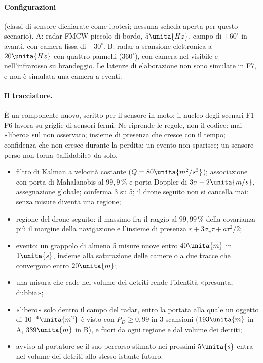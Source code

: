 \paragraph{Configurazioni} (classi di sensore dichiarate come ipotesi; nessuna scheda aperta per questo scenario). A: radar FMCW piccolo di bordo, $5\unita{Hz}$, campo di $\pm60^\circ$ in avanti, con camera fissa di $\pm30^\circ$. B: radar a scansione elettronica a $20\unita{Hz}$ con quattro pannelli ($360^\circ$), con camera nel visibile e nell'infrarosso su brandeggio. Le latenze di elaborazione non sono simulate in F7, e non è simulata una camera a eventi.

\paragraph{Il tracciatore.} È un componente nuovo, scritto per il sensore in moto: il nucleo degli scenari F1--F6 lavora su griglie di sensori fermi. Ne riprende le regole, non il codice: mai «libero» sul non osservato; insieme di presenza che cresce con il tempo; confidenza che non cresce durante la perdita; un evento non sparisce; un sensore perso non torna «affidabile» da solo.
\begin{itemize}
\item filtro di Kalman a velocità costante ($Q=80\unita{m^2/s^3}$); associazione con porta di Mahalanobis al $99{,}9\,\%$ e porta Doppler di $3\sigma+2\unita{m/s}$, assegnazione globale; conferma 3 su 5; il drone seguito non si cancella mai: senza misure diventa una regione;
\item regione del drone seguito: il massimo fra il raggio al $99{,}99\,\%$ della covarianza più il margine della navigazione e l'insieme di presenza $r+3\sigma_v\tau+a\tau^2/2$;
\item evento: un grappolo di almeno 5 misure nuove entro $40\unita{m}$ in $1\unita{s}$, insieme alla saturazione delle camere o a due tracce che convergono entro $20\unita{m}$;
\item una misura che cade nel volume dei detriti rende l'identità «presunta, dubbia»;
\item «libero» solo dentro il campo del radar, entro la portata alla quale un oggetto di $10^{-4}\unita{m^2}$ è visto con $P_D\ge0{,}99$ in 3 scansioni ($193\unita{m}$ in A, $339\unita{m}$ in B), e fuori da ogni regione e dal volume dei detriti;
\item avviso al portatore se il suo percorso stimato nei prossimi $5\unita{s}$ entra nel volume dei detriti allo stesso istante futuro.
\end{itemize}

